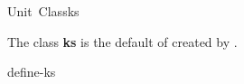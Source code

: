 \documentclass[10pt,twoside,english,pdftex]{article}
\begin{document}

\begin{functiondoc}{Unit~Class}{ks}{}
%
%

\fnsyntax

\fnpackage {}

\fnmodule {}

\fndescription 
{}%
The class \textbf{ks} is the default  of
 created by \textbf{}.

\begin{alsos}{define-ks}
\also[define-ks]
\also[ksa]
\end{alsos}

\end{functiondoc}

\end{document}
